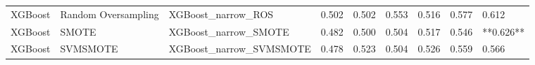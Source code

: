 \begin{tabular}{lllllllll}
                     XGBoost & Random Oversampling &                           XGBoost\_narrow\_ROS & 0.502 &                     0.502 &                 0.553 &                  0.516 &                                   0.577 &     0.612 \\
                     XGBoost &               SMOTE &                         XGBoost\_narrow\_SMOTE & 0.482 &                     0.500 &                 0.504 &                  0.517 &                                   0.546 & **0.626** \\
                     XGBoost &            SVMSMOTE &                      XGBoost\_narrow\_SVMSMOTE & 0.478 &                     0.523 &                 0.504 &                  0.526 &                                   0.559 &     0.566 \\
\bottomrule
\end{tabular}
